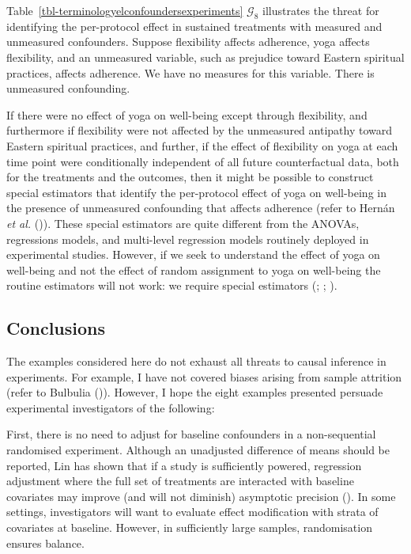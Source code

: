 \documentclass[
  single column]{article}
\begin{document}
Table~\ref{tbl-terminologyelconfoundersexperiments} \(\mathcal{G}_{8}\)
illustrates the threat for identifying the per-protocol effect in
sustained treatments with measured and unmeasured confounders. Suppose
flexibility affects adherence, yoga affects flexibility, and an
unmeasured variable, such as prejudice toward Eastern spiritual
practices, affects adherence. We have no measures for this variable.
There is unmeasured confounding.

If there were no effect of yoga on well-being except through
flexibility, and furthermore if flexibility were not affected by the
unmeasured antipathy toward Eastern spiritual practices, and further, if
the effect of flexibility on yoga at each time point were conditionally
independent of all future counterfactual data, both for the treatments
and the outcomes, then it might be possible to construct special
estimators that identify the per-protocol effect of yoga on well-being
in the presence of unmeasured confounding that affects adherence (refer
to Hernán \emph{et al.} ()). These
special estimators are quite different from the ANOVAs, regressions
models, and multi-level regression models routinely deployed in
experimental studies. However, if we seek to understand the effect of
yoga on well-being and not the effect of random assignment to yoga on
well-being the routine estimators will not work: we require special
estimators (;
;
).

\subsection{Conclusions}\label{conclusions}

The examples considered here do not exhaust all threats to causal
inference in experiments. For example, I have not covered biases arising
from sample attrition (refer to Bulbulia
()). However, I hope the eight
examples presented persuade experimental investigators of the following:

First, there is no need to adjust for baseline confounders in a
non-sequential randomised experiment. Although an unadjusted difference
of means should be reported, Lin has shown that if a study is
sufficiently powered, regression adjustment where the full set of
treatments are interacted with baseline covariates may improve (and will
not diminish) asymptotic precision
(). In some settings,
investigators will want to evaluate effect modification with strata of
covariates at baseline. However, in sufficiently large samples,
randomisation ensures balance.
\end{document}
